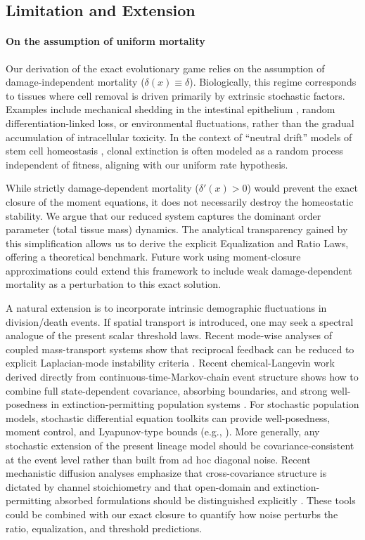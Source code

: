 \documentclass[pdflatex,sn-mathphys-ay]{sn-jnl}
\theoremstyle{thmstyleone}
\theoremstyle{definition}
\theoremstyle{remark}
\begin{document}
\subsection{Limitation and Extension}
\paragraph{On the assumption of uniform mortality}
Our derivation of the exact evolutionary game relies on the assumption of damage-independent mortality ($\delta(x) \equiv \delta$). 
Biologically, this regime corresponds to tissues where cell removal is driven primarily by extrinsic stochastic factors.
Examples include mechanical shedding in the intestinal epithelium \citep{blander_death_2016,williams_epithelial_2015}, random differentiation-linked loss, or environmental fluctuations, rather than the gradual accumulation of intracellular toxicity. 
In the context of ``neutral drift'' models of stem cell homeostasis \citep{xu_modeling_2018,traulsen_dynamics_2013}, clonal extinction is often modeled as a random process independent of fitness, aligning with our uniform rate hypothesis.

While strictly damage-dependent mortality ($\delta'(x) > 0$) would prevent the exact closure of the moment equations, it does not necessarily destroy the homeostatic stability. We argue that our reduced system captures the dominant order parameter (total tissue mass) dynamics. The analytical transparency gained by this simplification allows us to derive the explicit Equalization and Ratio Laws, offering a theoretical benchmark. Future work using moment-closure approximations could extend this framework to include weak damage-dependent mortality as a perturbation to this exact solution.

A natural extension is to incorporate intrinsic demographic fluctuations in division/death events. 
If spatial transport is introduced, one may seek a spectral analogue of the present scalar threshold laws. Recent mode-wise analyses of coupled mass-transport systems show that reciprocal feedback can be reduced to explicit Laplacian-mode instability criteria \citep{yu_mode-wise_2026}.
Recent chemical-Langevin work derived directly from continuous-time-Markov-chain event structure shows how to combine full state-dependent covariance, absorbing boundaries, and strong well-posedness in extinction-permitting population systems \citep{yu_full-covariance_2026}.
For stochastic population models, stochastic differential equation toolkits can provide well-posedness, moment control, and Lyapunov-type bounds (e.g., \citep{wang_analysis_2025-1}).
More generally, any stochastic extension of the present lineage model should be covariance-consistent at the event level rather than built from ad hoc diagonal noise. Recent mechanistic diffusion analyses emphasize that cross-covariance structure is dictated by channel stoichiometry and that open-domain and extinction-permitting absorbed formulations should be distinguished explicitly \citep{yu_beyond_2026}.
These tools could be combined with our exact closure to quantify how noise perturbs the ratio, equalization, and threshold predictions.
\end{document}
